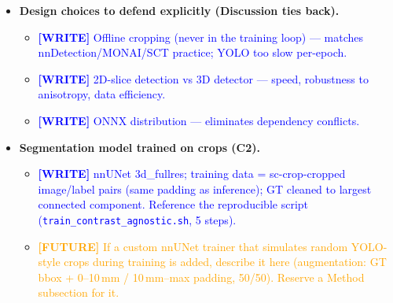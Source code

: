 \documentclass[11pt]{article}
\newcommand{\WRITE}[1]{\textcolor{blue}{\textbf{[WRITE]} #1}}
\newcommand{\FUTURE}[1]{\textcolor{orange}{\textbf{[FUTURE]} #1}}
\begin{document}
\begin{itemize}
    \begin{itemize}
      \item \WRITE{ONNX Runtime (CPU, no ultralytics/torch at runtime) vs
            PyTorch (.pt, GPU). SHA256-pinned, versioned model cache;
            \texttt{SC\_CROP\_CACHE\_DIR} for SCT/air-gapped HPC.}
      \item \WRITE{Atomic public API: detect() / crop() / uncrop() — what makes
            it embeddable (nnUNet preprocessing, SCT, custom loops).}
    \end{itemize}
  \item \textbf{Design choices to defend explicitly (Discussion ties back).}
    \begin{itemize}
      \item \WRITE{Offline cropping (never in the training loop) — matches
            nnDetection/MONAI/SCT practice; YOLO too slow per-epoch.}
      \item \WRITE{2D-slice detection vs 3D detector — speed, robustness to
            anisotropy, data efficiency.}
      \item \WRITE{ONNX distribution — eliminates dependency conflicts.}
    \end{itemize}
  \item \textbf{Segmentation model trained on crops (C2).}
    \begin{itemize}
      \item \WRITE{nnUNet 3d\_fullres; training data = sc-crop-cropped
            image/label pairs (same padding as inference); GT cleaned to
            largest connected component. Reference the reproducible script
            (\texttt{train\_contrast\_agnostic.sh}, 5 steps).}
      \item \FUTURE{If a custom nnUNet trainer that simulates random YOLO-style
            crops during training is added, describe it here (augmentation:
            GT bbox + 0--10\,mm / 10\,mm--max padding, 50/50). Reserve a
            Method subsection for it.}
    \end{itemize}
\end{itemize}

\end{document}
